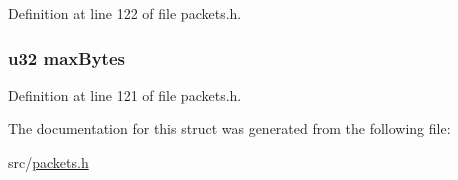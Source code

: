 Definition at line 122 of file packets.\+h.

\hypertarget{struct_b_e_g_i_n___u_p_l_o_a_d_afaa1cba2adac85d9d83f4671acc5fbf8}{}
\subsubsection[{max\+Bytes}]{ {\bf u32} max\+Bytes}\label{struct_b_e_g_i_n___u_p_l_o_a_d_afaa1cba2adac85d9d83f4671acc5fbf8}


Definition at line 121 of file packets.\+h.



The documentation for this struct was generated from the following file\+:\begin{DoxyCompactItemize}
\item 
src/\hyperlink{packets_8h}{packets.\+h}\end{DoxyCompactItemize}
